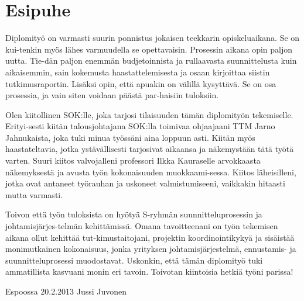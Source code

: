 \documentclass[12pt,a4paper,oneside,pdftex]{report}
\newcommand{\FDATE}{20.2.2013}
\newcommand{\AUTHOR}{Jussi Juvonen}
\begin{document}
\chapter*{Esipuhe}

Diplomityö on varmasti suurin ponnistus jokaisen teekkarin opiskeluaikana. Se on kui-tenkin myös lähes varmuudella se opettavaisin. Prosessin aikana opin paljon uutta. Tie-dän paljon enemmän budjetoinnista ja rullaavasta suunnittelusta kuin aikaisemmin, sain kokemusta haastattelemisesta ja osaan kirjoittaa siistin tutkimusraportin. Lisäksi opin, että apuakin on välillä kysyttävä. Se on osa prosessia, ja vain siten voidaan päästä par-haisiin tuloksiin.

Olen kiitollinen SOK:lle, joka tarjosi tilaisuuden tämän diplomityön tekemiselle. Erityi-sesti kiitän talousjohtajana SOK:lla toimivaa ohjaajaani TTM Jarno Jahnukaista, joka tuki minua työssäni aina loppuun asti. Kiitän myös haastateltavia, jotka ystävällisesti tarjosivat aikaansa ja näkemystään tätä työtä varten. Suuri kiitos valvojalleni professori Ilkka Kauraselle arvokkaasta näkemyksestä ja avusta työn kokonaisuuden muokkaami-sessa. Kiitos läheisilleni, jotka ovat antaneet työrauhan ja uskoneet valmistumiseeni, vaikkakin hitaasti mutta varmasti.

Toivon että työn tuloksista on hyötyä S-ryhmän suunnitteluprosessin ja johtamisjärjes-telmän kehittämissä. Omana tavoitteenani on työn tekemisen aikana ollut kehittää tut-kimustaitojani, projektin koordinointikykyä ja sisäistää monimutkainen kokonaisuus, jonka yrityksen johtamisjärjestelmä, ennustamis- ja suunnitteluprosessi muodostavat. Uskonkin, että tämän diplomityö tuki ammatillista kasvuani monin eri tavoin. Toivotan kiintoisia hetkiä työni parissa!

\vskip 10mm

\noindent Espoossa \FDATE
\vskip 5mm
\noindent\AUTHOR

\cleardoublepage
% 

\end{document}
